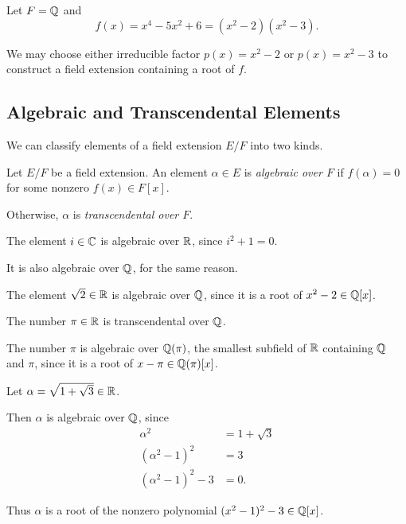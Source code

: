 \documentclass[main.tex]{subfiles}
\begin{document}
\begin{example}
Let $F=\mathbb{Q}$ and
\[
f(x)=x^4-5x^2+6=(x^2-2)(x^2-3).
\]

We may choose either irreducible factor
$p(x)=x^2-2$ or $p(x)=x^2-3$ to construct a field
extension containing a root of $f$.
\end{example}


\subsection{Algebraic and Transcendental Elements}

We can classify elements of a field extension $E/F$ into two kinds.

\begin{definition}
Let $E/F$ be a field extension. An element $\alpha\in E$ is
\emph{algebraic over $F$} if $f(\alpha)=0$ for some nonzero
$f(x)\in F[x]$.

Otherwise, $\alpha$ is \emph{transcendental over $F$}.
\end{definition}


\begin{example}
The element $i\in\mathbb{C}$ is algebraic over $\mathbb{R}$, since
$i^2+1=0$.

It is also algebraic over $\mathbb{Q}$, for the same reason.
\end{example}


\begin{example}
The element $\sqrt{2}\in\mathbb{R}$ is algebraic over $\mathbb{Q}$, since
it is a root of $x^2-2\in\mathbb{Q}[x]$.
\end{example}


\begin{example}
The number $\pi\in\mathbb{R}$ is transcendental over $\mathbb{Q}$.
\end{example}


\begin{example}
The number $\pi$ is algebraic over $\mathbb{Q}(\pi)$, the smallest
subfield of $\mathbb{R}$ containing $\mathbb{Q}$ and $\pi$, since it is a root
of $x-\pi\in\mathbb{Q}(\pi)[x]$.
\end{example}


\begin{example}
Let $\alpha=\sqrt{1+\sqrt{3}}\in\mathbb{R}$.

Then $\alpha$ is algebraic over $\mathbb{Q}$, since
\[
\begin{aligned}
\alpha^2&=1+\sqrt{3}\\
(\alpha^2-1)^2&=3\\
(\alpha^2-1)^2-3&=0.
\end{aligned}
\]

Thus $\alpha$ is a root of the nonzero polynomial
$(x^2-1)^2-3\in\mathbb{Q}[x]$.
\end{example}
\end{document}
